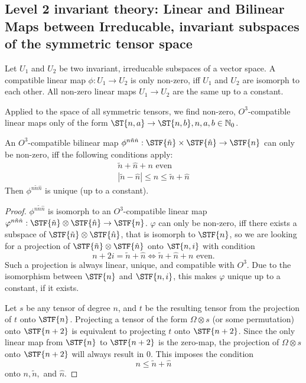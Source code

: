 {\subsection{Level 2 invariant theory: Linear and Bilinear Maps between Irreducable, invariant subspaces of the symmetric tensor space}
\begin{lemma}
	Let $U_1$ and $U_2$ be two invariant, irreducable subspaces of a vector space. A compatible linear map $\phi: U_1 \to U_2$ is only non-zero, iff $U_1$ and $U_2$ are isomorph to each other. All non-zero linear maps $U_1 \to U_2$ are the same up to a constant.
\end{lemma}
Applied to the space of all symmetric tensors, we find non-zero, $O^3$-compatible linear maps only of the form $\ST{n,a}\to\ST{n,b}, n,a,b \in \IN_0$.
\begin{lemma}
	An $O^3$-compatible bilinear map $\phi^{n\tilde{n}\hat{n}}: \STF{\tilde{n}}\times\STF{\hat{n}}\to\STF{n}$ can only be non-zero, iff the following conditions apply:
	\begin{align*}
		\tilde{n}+\hat{n} + n \text{ even}\\
		|\tilde{n}-\hat{n}|\leq n\leq \tilde{n}+\hat{n}
	\end{align*}
	Then $\phi^{n\tilde{n}\hat{n}}$ is unique (up to a constant).
\end{lemma}
\begin{proof}
	$\phi^{n\tilde{n}\hat{n}}$ is isomorph to an $O^3$-compatible linear map $\varphi^{n\tilde{n}\hat{n}}: \STF{\tilde{n}}\otimes\STF{\hat{n}}\to\STF{n}$. $\varphi$ can only be non-zero, iff there exists a subspace of $\STF{\tilde{n}}\otimes\STF{\hat{n}}$, that is isomorph to $\STF{n}$, so we are looking for a projection of $\STF{\tilde{n}}\otimes\STF{\hat{n}}$ onto $\ST{n,i}$ with condition \[n+2i=\tilde{n}+\hat{n} \iff \tilde{n}+\hat{n} + n \text{ even}.\]
	Such a projection is always linear, unique, and compatible with $O^3$. Due to the isomorphism between $\STF{n}$ and $\STF{n,i}$, this makes $\varphi$ unique up to a constant, if it exists. 
	
	Let $s$ be any tensor of degree $n$, and $t$ be the resulting tensor from the projection of $t$ onto $\STF{n}$. Projecting a tensor of the form $\Omega \otimes s$ (or some permutation) onto $\STF{n+2}$ is equivalent to projecting $t$ onto $\STF{n+2}$. Since the only linear map from $\STF{n}$ to $\STF{n+2}$ is the zero-map, the projection of $\Omega \otimes s$ onto $\STF{n+2}$ will always result in $0$. This imposes the condition
	\[n\leq \tilde{n}+\hat{n}\]
	onto $n, \tilde{n},$ and $\hat{n}$.
	

\end{proof}}
